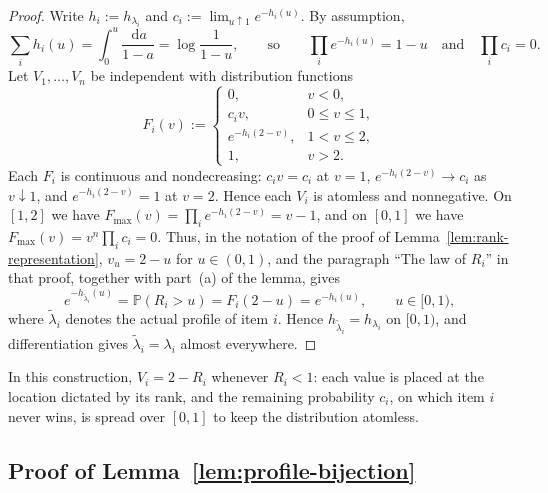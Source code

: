\documentclass[11pt]{article}
\theoremstyle{definition}
\theoremstyle{remark}
\newcommand{\Pp}{\mathbb P}
\newcommand{\dd}{\,\mathrm d}
\begin{document}
\begin{proof}
Write $h_i:=h_{\lambda_i}$ and $c_i:=\lim_{u\uparrow1}e^{-h_i(u)}$.
By assumption,
\[
 \sum_ih_i(u)=\int_0^u\frac{\dd a}{1-a}=\log\frac1{1-u},
 \qquad\text{so}\qquad
 \prod_ie^{-h_i(u)}=1-u
 \quad\text{and}\quad
 \prod_ic_i=0.
\]
Let $V_1,\ldots,V_n$ be independent with distribution functions
\begin{equation}\label{eq:profile-realization}
 F_i(v):=
 \begin{cases}
  0,&v<0,\\
  c_iv,&0\le v\le1,\\
  e^{-h_i(2-v)},&1<v\le2,\\
  1,&v>2.
 \end{cases}
\end{equation}
Each $F_i$ is continuous and nondecreasing: $c_iv=c_i$ at $v=1$, $e^{-h_i(2-v)}\to c_i$ as $v\downarrow1$, and $e^{-h_i(2-v)}=1$ at $v=2$.
Hence each $V_i$ is atomless and nonnegative.
On $[1,2]$ we have $F_{\max}(v)=\prod_ie^{-h_i(2-v)}=v-1$, and on $[0,1]$ we have $F_{\max}(v)=v^n\prod_ic_i=0$.
Thus, in the notation of the proof of Lemma~\ref{lem:rank-representation}, $v_u=2-u$ for $u\in(0,1)$, and the paragraph ``The law of $R_i$'' in that proof, together with part~(a) of the lemma, gives
\[
 e^{-h_{\widetilde\lambda_i}(u)}=\Pp(R_i>u)=F_i(2-u)=e^{-h_i(u)},
 \qquad u\in[0,1),
\]
where $\widetilde\lambda_i$ denotes the actual profile of item $i$.
Hence $h_{\widetilde\lambda_i}=h_{\lambda_i}$ on $[0,1)$, and differentiation gives $\widetilde\lambda_i=\lambda_i$ almost everywhere.
\end{proof}

In this construction, $V_i=2-R_i$ whenever $R_i<1$: each value is placed at the location dictated by its rank, and the remaining probability $c_i$, on which item $i$ never wins, is spread over $[0,1]$ to keep the distribution atomless.

\subsection{Proof of Lemma~\ref{lem:profile-bijection}}
\end{document}
